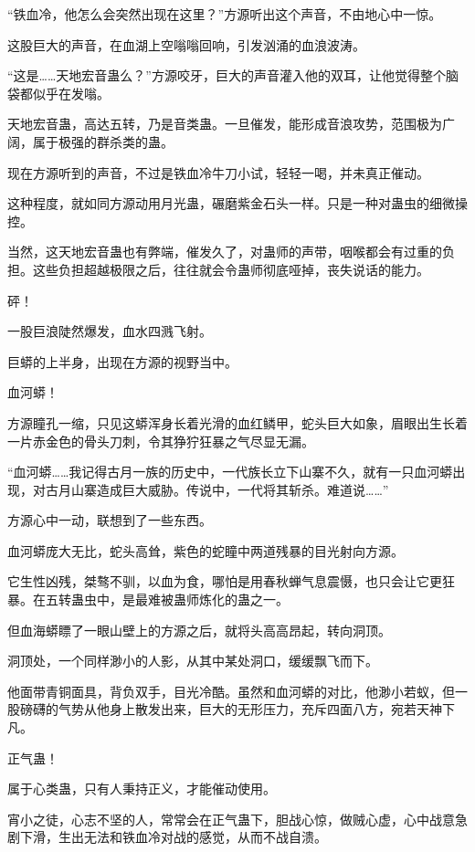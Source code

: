 
\begin{this_body}

“铁血冷，他怎么会突然出现在这里？”方源听出这个声音，不由地心中一惊。

这股巨大的声音，在血湖上空嗡嗡回响，引发汹涌的血浪波涛。

“这是……天地宏音蛊么？”方源咬牙，巨大的声音灌入他的双耳，让他觉得整个脑袋都似乎在发嗡。

天地宏音蛊，高达五转，乃是音类蛊。一旦催发，能形成音浪攻势，范围极为广阔，属于极强的群杀类的蛊。

现在方源听到的声音，不过是铁血冷牛刀小试，轻轻一喝，并未真正催动。

这种程度，就如同方源动用月光蛊，碾磨紫金石头一样。只是一种对蛊虫的细微操控。

当然，这天地宏音蛊也有弊端，催发久了，对蛊师的声带，咽喉都会有过重的负担。这些负担超越极限之后，往往就会令蛊师彻底哑掉，丧失说话的能力。

砰！

一股巨浪陡然爆发，血水四溅飞射。

巨蟒的上半身，出现在方源的视野当中。

血河蟒！

方源瞳孔一缩，只见这蟒浑身长着光滑的血红鳞甲，蛇头巨大如象，眉眼出生长着一片赤金色的骨头刀刺，令其狰狞狂暴之气尽显无漏。

“血河蟒……我记得古月一族的历史中，一代族长立下山寨不久，就有一只血河蟒出现，对古月山寨造成巨大威胁。传说中，一代将其斩杀。难道说……”

方源心中一动，联想到了一些东西。

血河蟒庞大无比，蛇头高耸，紫色的蛇瞳中两道残暴的目光射向方源。

它生性凶残，桀骜不驯，以血为食，哪怕是用春秋蝉气息震慑，也只会让它更狂暴。在五转蛊虫中，是最难被蛊师炼化的蛊之一。

但血海蟒瞟了一眼山壁上的方源之后，就将头高高昂起，转向洞顶。

洞顶处，一个同样渺小的人影，从其中某处洞口，缓缓飘飞而下。

他面带青铜面具，背负双手，目光冷酷。虽然和血河蟒的对比，他渺小若蚁，但一股磅礴的气势从他身上散发出来，巨大的无形压力，充斥四面八方，宛若天神下凡。

正气蛊！

属于心类蛊，只有人秉持正义，才能催动使用。

宵小之徒，心志不坚的人，常常会在正气蛊下，胆战心惊，做贼心虚，心中战意急剧下滑，生出无法和铁血冷对战的感觉，从而不战自溃。


\end{this_body}
